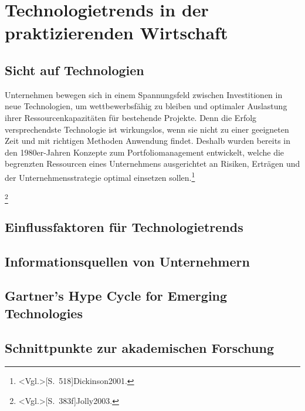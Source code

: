 \section{Technologietrends in der praktizierenden Wirtschaft}


\subsection{Sicht auf Technologien}
Unternehmen bewegen sich in einem Spannungsfeld zwischen Investitionen in neue Technologien, um wettbewerbsfähig zu bleiben und optimaler Auslastung ihrer Ressourcenkapazitäten für bestehende Projekte. Denn die Erfolg versprechendste Technologie ist wirkungslos, wenn sie nicht zu einer geeigneten Zeit und mit richtigen Methoden Anwendung findet. Deshalb wurden bereits in den 1980er-Jahren Konzepte zum Portfoliomanagement entwickelt, welche die begrenzten Ressourcen eines Unternehmens ausgerichtet an Risiken, Erträgen und der Unternehmensstrategie optimal einsetzen sollen.\footnote{\citeNP<Vgl.>[S.~518]{Dickinson2001}.} 



\footnote{\citeNP<Vgl.>[S.~383f]{Jolly2003}.}

\subsection{Einflussfaktoren für Technologietrends}
\subsection{Informationsquellen von Unternehmern}
\subsection{Gartner’s Hype Cycle for Emerging Technologies}
\subsection{Schnittpunkte zur akademischen Forschung}